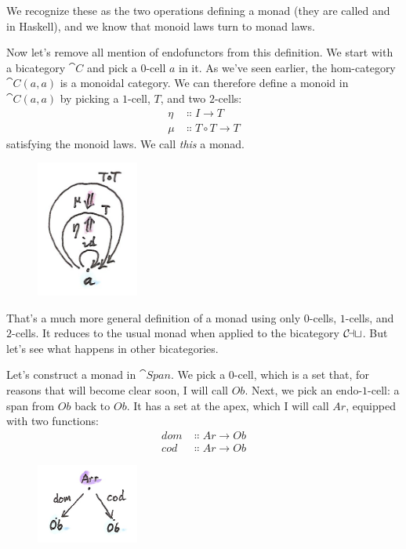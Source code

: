 \noindent
We recognize these as the two operations defining a monad (they are
called  and  in Haskell), and we know that
monoid laws turn to monad laws.

Now let's remove all mention of endofunctors from this definition. We
start with a bicategory $\cat{C}$ and pick a $0$-cell $a$ in it.
As we've seen earlier, the hom-category $\cat{C}(a, a)$ is a monoidal
category. We can therefore define a monoid in $\cat{C}(a, a)$ by
picking a $1$-cell, $T$, and two $2$-cells:
\begin{align*}
\eta &\Colon I \to T \\
\mu &\Colon T \circ T \to T
\end{align*}
satisfying the monoid laws. We call \emph{this} a monad.

\begin{figure}[H]
\centering
\includegraphics[width=0.3\textwidth]{images/bimonad.png}
\end{figure}

\noindent
That's a much more general definition of a monad using only $0$-cells,
$1$-cells, and $2$-cells. It reduces to the usual monad when applied to the
bicategory $\mathcal{C\mkern-3mu at}$. But let's see what happens in other
bicategories.

Let's construct a monad in $\cat{Span}$. We pick a $0$-cell, which is a
set that, for reasons that will become clear soon, I will call
$Ob$. Next, we pick an endo-$1$-cell: a span from $Ob$ back
to $Ob$. It has a set at the apex, which I will call $Ar$,
equipped with two functions:
\begin{align*}
dom &\Colon Ar \to Ob \\
cod &\Colon Ar \to Ob
\end{align*}

\begin{figure}[H]
\centering
\includegraphics[width=0.3\textwidth]{images/spanmonad.png}
\end{figure}

